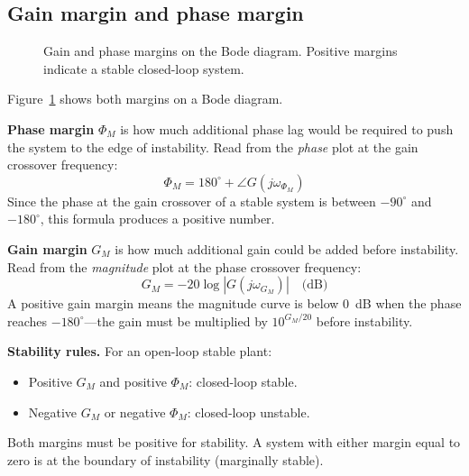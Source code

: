 \documentclass[../../book.tex]{subfiles}
\begin{document}
\subsection{Gain margin and phase margin}
\label{sec:gm_pm}

\begin{figure}[htbp]
  \caption{Gain and phase margins on the Bode diagram.  Positive margins
    indicate a stable closed-loop system.}
  \label{fig:margins_bode}
\end{figure}

Figure~\ref{fig:margins_bode} shows both margins on a Bode diagram.

\textbf{Phase margin} $\Phi_M$ is how much additional phase lag would be
required to push the system to the edge of instability.  Read from the
\emph{phase} plot at the gain crossover frequency:
\begin{equation}
  \boxed{\Phi_M = 180^\circ + \angle G(j\omega_{\Phi_M})}
  \label{eq:phase_margin}
\end{equation}
Since the phase at the gain crossover of a stable system is between $-90^\circ$
and $-180^\circ$, this formula produces a positive number.

\textbf{Gain margin} $G_M$ is how much additional gain could be added before
instability.  Read from the \emph{magnitude} plot at the phase crossover
frequency:
\begin{equation}
  \boxed{G_M = -20\log|G(j\omega_{G_M})| \quad \text{(dB)}}
  \label{eq:gain_margin}
\end{equation}
A positive gain margin means the magnitude curve is below 0~dB when the phase
reaches $-180^\circ$---the gain must be multiplied by $10^{G_M/20}$ before
instability.

\medskip
\noindent\textbf{Stability rules.}  For an open-loop stable plant:
\begin{itemize}
  \item Positive $G_M$ and positive $\Phi_M$: closed-loop stable.
  \item Negative $G_M$ or negative $\Phi_M$: closed-loop unstable.
\end{itemize}
Both margins must be positive for stability.  A system with either margin equal
to zero is at the boundary of instability (marginally stable).
\end{document}
